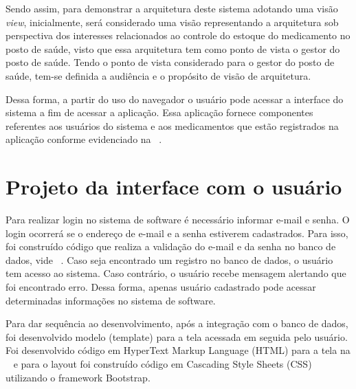 Sendo assim, para demonstrar a arquitetura deste sistema adotando uma visão \emph{view}, inicialmente, será considerado uma visão  representando a arquitetura sob perspectiva dos interesses relacionados ao controle do estoque do medicamento no posto de saúde, visto que essa arquitetura tem como ponto de vista o gestor do posto de saúde. Tendo o ponto de vista considerado para o gestor do posto de saúde, tem-se definida a audiência e o propósito de visão de arquitetura.

Dessa forma, a partir do uso do navegador o usuário pode acessar a interface do sistema a fim de acessar a aplicação. Essa aplicação fornece componentes referentes aos usuários do sistema e aos medicamentos que estão registrados na aplicação conforme evidenciado na ~.





\section{Projeto da interface com o usuário}



Para realizar login no sistema de software é necessário informar e-mail e senha. O login ocorrerá se o endereço de e-mail e a senha estiverem cadastrados. Para isso, foi construído código que realiza a validação do e-mail e da senha no banco de dados, vide ~. Caso seja encontrado um registro no banco de dados, o usuário tem acesso ao sistema. Caso contrário, o usuário recebe mensagem alertando que foi encontrado erro. Dessa forma, apenas usuário cadastrado pode acessar determinadas informações no sistema de software. 

%

Para dar sequência ao desenvolvimento, após a integração com o banco de dados, foi desenvolvido  modelo (template) para a tela acessada em seguida pelo usuário. Foi desenvolvido código em HyperText Markup Language (HTML) para a tela na ~ e para o layout foi construído código em Cascading Style Sheets (CSS) utilizando o framework Bootstrap. 


%

%

